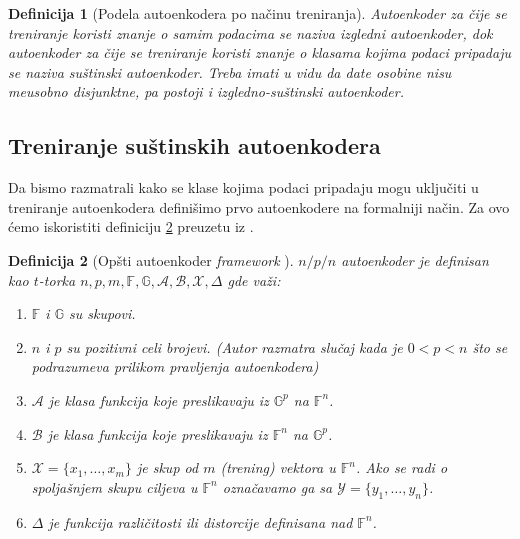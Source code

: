 \documentclass{article}
\newtheorem{definition}{Definicija}
\begin{document}
	\begin{definition}[Podela autoenkodera po na\v cinu treniranja]
		\label{autoencoder-training-based-types}
		Autoenkoder za \v cije se treniranje koristi znanje o samim podacima se naziva \emph{izgledni autoenkoder}, dok autoenkoder za \v cije se treniranje koristi znanje o klasama kojima podaci pripadaju se naziva \emph{su\v stinski autoenkoder}. Treba imati u vidu da date osobine nisu me\dj usobno disjunktne, pa postoji i \emph{izgledno-su\v stinski autoenkoder}.
	\end{definition}


	\subsection{Treniranje su\v stinskih autoenkodera}
	\label{treniranje-sustinskih-autoenkodera}
	
	Da bismo razmatrali kako se klase kojima podaci pripadaju mogu uklju\v citi u treniranje autoenkodera defini\v simo prvo autoenkodere na formalniji na\v cin. 
	Za ovo \'cemo iskoristiti definiciju \ref{general-autoencoder-framework} preuzetu iz \cite[Poglavlje 2]{pmlr-v27-baldi12a}.
	
	\begin{definition}[Op\v sti autoenkoder \textit{framework} \cite{pmlr-v27-baldi12a}]
		\label{general-autoencoder-framework}
		\sloppy $n/p/n$ autoenkoder je definisan kao $t$-torka $n, p, m, \mathbb{F}, \mathbb{G}, \mathcal{A}, \mathcal{B}, \mathcal{X}, \Delta$ gde va\v zi:
		\begin{enumerate}
			\addtolength{\itemindent}{1em}
			\item $\mathbb{F}$ i $\mathbb{G}$ su skupovi.
			\item $n$ i $p$ su pozitivni celi brojevi. (Autor razmatra slu\v caj kada je $0 < p < n$ \v sto se podrazumeva prilikom pravljenja autoenkodera)
			\item $\mathcal{A}$ je klasa funkcija koje preslikavaju iz  $\mathbb{G}^p$ na $\mathbb{F}^n$.
			\item $\mathcal{B}$ je klasa funkcija koje preslikavaju iz $\mathbb{F}^n$ na $\mathbb{G}^p$.
			\item $\mathcal{X} = \{x_1, \ldots, x_m\}$ je skup od $m$ (trening) vektora u $\mathbb{F}^n$. Ako se radi o spolja\v snjem skupu ciljeva u $\mathbb{F}^n$ ozna\v cavamo ga sa $\mathcal{Y} = \{y_1, \ldots, y_n\}$.
			\item $\Delta$ je funkcija razli\v citosti ili distorcije definisana nad $\mathbb{F}^n$.
		\end{enumerate}
	\end{definition}
	
\end{document}
